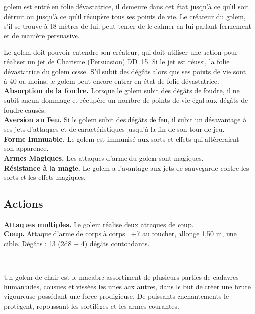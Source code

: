\begin{figure*}[hbp]
{\begin{minipage}[c]{.45\linewidth}
               golem est entré en folie dévastatrice, il demeure dans cet état jusqu'à ce qu'il soit 
               détruit ou jusqu'à ce qu'il récupère tous ses points de vie. Le créateur du golem, s'il se 
               trouve à 18 mètres de lui, peut tenter de le calmer en lui parlant fermement et de manière 
               persuasive.   \end{minipage}
  \hspace{4pt}
  \begin{minipage}[c]{.45\linewidth}
               Le golem doit pouvoir entendre son créateur, qui doit utiliser une action pour 
               réaliser un jet de Charisme (Persuasion) DD~15.
               Si le jet est réussi, la folie dévastatrice 
               du golem cesse. S'il subit des dégâts alors que ses points de vie sont à 40 ou moins, le 
               golem peut encore entrer en état de folie dévastatrice. \\
    {\bfseries Absorption de la foudre.} Lorsque le golem subit des dégâts de foudre, il ne subit aucun 
               dommage et récupère un nombre de points de vie égal aux dégâts de foudre causés. \\
    {\bfseries Aversion au Feu.} Si le golem subit des dégâts de feu, il subit un désavantage à ses jets 
               d'attaques et de caractéristiques jusqu'à la fin de son tour de jeu. \\
    {\bfseries Forme Immuable.} Le golem est immunisé aux sorts et effets qui altèreraient son apparence. \\
    {\bfseries Armes Magiques.} Les attaques d'arme du golem sont magiques. \\
    {\bfseries Résistance à la magie.} Le golem a l'avantage aux jets de sauvegarde contre les sorts et les 
               effets magiques.
\vspace{-10pt}
    \subsection*{Actions}
    {\bfseries Attaques multiples.} Le golem réalise deux attaques de coup.\\
    {\bfseries Coup.} Attaque d'arme de corps à corps : +7 au toucher, allonge 1,50 m, une cible. 
               Dégâts : 13 (2d8 + 4) dégâts contondants. \\
    \noindent\rule{\textwidth}{1pt} \\
    Un golem de chair est le macabre assortiment de plusieurs parties de cadavres humanoïdes, cousues et 
    vissées les unes aux autres, dans le but de créer une brute vigoureuse possédant une force prodigieuse. 
    De puissants enchantements le protègent, repoussant les sortilèges et les armes courantes.
  \end{minipage}
}%
\end{figure*}

